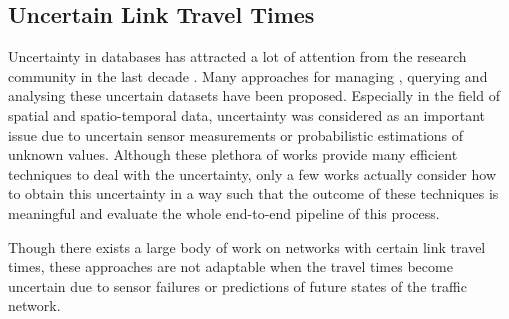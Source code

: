 
\subsection{Uncertain Link Travel Times}
\label{subsec:ult}
Uncertainty in databases has attracted a lot of attention from the research
community in the last decade . Many approaches for managing
\cite{AgrBenDasHayetal06,AntJanKocOlt07,JamXuWu08}, querying
\cite{SolIlyCha07,LiSahDes09} and analysing \cite{ChuKaoHun07,ChaCheKaoNr06}
these uncertain datasets have been proposed.
Especially in the field of spatial \cite{CheXiaPra04,DaiYiuMam05} and
spatio-temporal \cite{EmrKriMam12,NieZueEmr13} data, uncertainty was considered
as an important issue due to uncertain sensor measurements or
probabilistic estimations of unknown values. Although these plethora of works
provide many efficient techniques to deal with the uncertainty, only a few works
actually consider how to obtain this uncertainty in a way such that the outcome
of these techniques is meaningful and evaluate the whole end-to-end pipeline of
this process.

Though there exists a large body of work on networks with certain link travel
times, these approaches are not adaptable when the travel times become
uncertain due to sensor failures or predictions of future states of the traffic
network.

